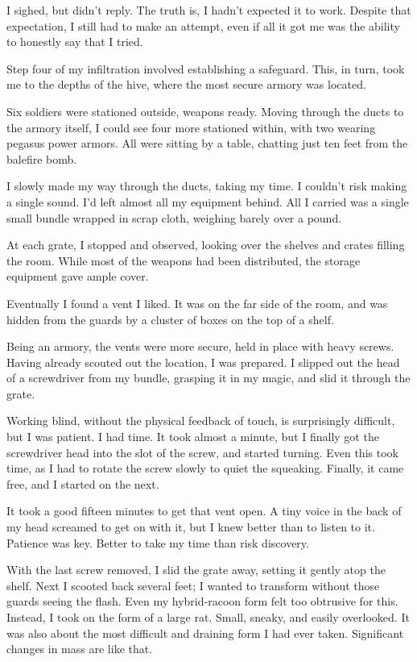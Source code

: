 I sighed, but didn’t reply. The truth is, I hadn’t expected it to work. Despite that expectation, I still had to make an attempt, even if all it got me was the ability to honestly say that I tried.

{\br}%
Step four of my infiltration involved establishing a safeguard. This, in turn, took me to the depths of the hive, where the most secure armory was located.

Six soldiers were stationed outside, weapons ready. Moving through the ducts to the armory itself, I could see four more stationed within, with two wearing pegasus power armors. All were sitting by a table, chatting just ten feet from the balefire bomb.

I slowly made my way through the ducts, taking my time. I couldn’t risk making a single sound. I’d left almost all my equipment behind. All I carried was a single small bundle wrapped in scrap cloth, weighing barely over a pound.

At each grate, I stopped and observed, looking over the shelves and crates filling the room. While most of the weapons had been distributed, the storage equipment gave ample cover.

Eventually I found a vent I liked. It was on the far side of the room, and was hidden from the guards by a cluster of boxes on the top of a shelf.

Being an armory, the vents were more secure, held in place with heavy screws. Having already scouted out the location, I was prepared. I slipped out the head of a screwdriver from my bundle, grasping it in my magic, and slid it through the grate.

Working blind, without the physical feedback of touch, is surprisingly difficult, but I was patient. I had time. It took almost a minute, but I finally got the screwdriver head into the slot of the screw, and started turning. Even this took time, as I had to rotate the screw slowly to quiet the squeaking. Finally, it came free, and I started on the next.

It took a good fifteen minutes to get that vent open. A tiny voice in the back of my head screamed to get on with it, but I knew better than to listen to it. Patience was key. Better to take my time than risk discovery.

With the last screw removed, I slid the grate away, setting it gently atop the shelf. Next I scooted back several feet; I wanted to transform without those guards seeing the flash. Even my hybrid-racoon form felt too obtrusive for this. Instead, I took on the form of a large rat. Small, sneaky, and easily overlooked. It was also about the most difficult and draining form I had ever taken. Significant changes in mass are like that.

